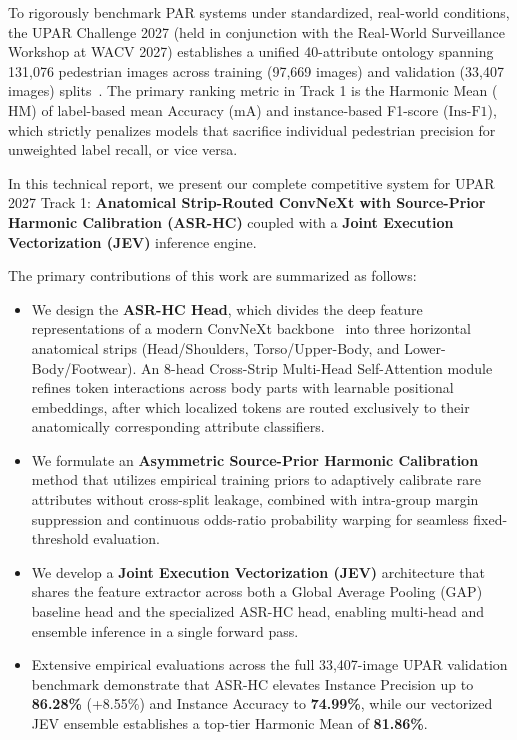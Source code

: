 To rigorously benchmark PAR systems under standardized, real-world conditions, the UPAR Challenge 2027 (held in conjunction with the Real-World Surveillance Workshop at WACV 2027) establishes a unified 40-attribute ontology spanning 131,076 pedestrian images across training (97,669 images) and validation (33,407 images) splits~\cite{specker2023upar,cormier2024upar}. The primary ranking metric in Track 1 is the Harmonic Mean ($\text{HM}$) of label-based mean Accuracy ($\text{mA}$) and instance-based F1-score ($\text{Ins-F1}$), which strictly penalizes models that sacrifice individual pedestrian precision for unweighted label recall, or vice versa.

In this technical report, we present our complete competitive system for UPAR 2027 Track 1: \textbf{Anatomical Strip-Routed ConvNeXt with Source-Prior Harmonic Calibration (ASR-HC)} coupled with a \textbf{Joint Execution Vectorization (JEV)} inference engine. 

The primary contributions of this work are summarized as follows:
\begin{itemize}
    \item We design the \textbf{ASR-HC Head}, which divides the deep feature representations of a modern ConvNeXt backbone~\cite{liu2022convnet} into three horizontal anatomical strips (Head/Shoulders, Torso/Upper-Body, and Lower-Body/Footwear). An 8-head Cross-Strip Multi-Head Self-Attention module refines token interactions across body parts with learnable positional embeddings, after which localized tokens are routed exclusively to their anatomically corresponding attribute classifiers.
    \item We formulate an \textbf{Asymmetric Source-Prior Harmonic Calibration} method that utilizes empirical training priors to adaptively calibrate rare attributes without cross-split leakage, combined with intra-group margin suppression and continuous odds-ratio probability warping for seamless fixed-threshold evaluation.
    \item We develop a \textbf{Joint Execution Vectorization (JEV)} architecture that shares the feature extractor across both a Global Average Pooling (GAP) baseline head and the specialized ASR-HC head, enabling multi-head and ensemble inference in a single forward pass.
    \item Extensive empirical evaluations across the full 33,407-image UPAR validation benchmark demonstrate that ASR-HC elevates Instance Precision up to \textbf{86.28\%} (+8.55\%) and Instance Accuracy to \textbf{74.99\%}, while our vectorized JEV ensemble establishes a top-tier Harmonic Mean of \textbf{81.86\%}.
\end{itemize}
